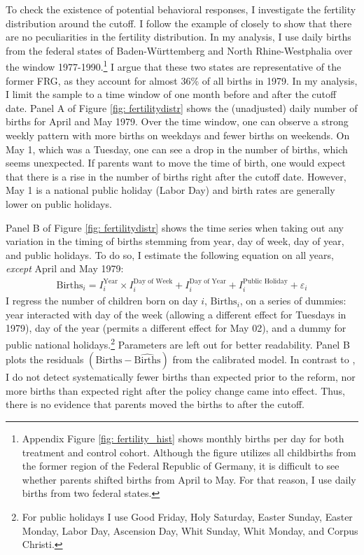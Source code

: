 \documentclass[11pt, a4paper, draft]{article} %
\begin{document}
To check the existence of potential behavioral responses, I investigate the fertility distribution around the cutoff. I follow the example of \cite{gans2009born} closely to show that there are no peculiarities in the fertility distribution. In my analysis, I use daily births from the federal states of Baden-Württemberg and North Rhine-Westphalia over the window 1977-1990.\footnote{Appendix Figure \ref{fig: fertility_hist} shows monthly births per day for both treatment and control cohort. Although the figure utilizes all childbirths from the former region of the Federal Republic of Germany, it is difficult to see whether parents shifted births from April to May. For that reason, I use daily births from two federal states.} I argue that these two states are representative of the former FRG, as they account for almost 36\% of all births in 1979. In my analysis, I limit the sample to a time window of one month before and after the cutoff date. Panel A of Figure \ref{fig: fertilitydistr} shows the (unadjusted) daily number of births for April and May 1979. Over the time window, one can observe a strong weekly pattern with more births on weekdays and fewer births on weekends. On May 1, which was a Tuesday, one can see a drop in the number of births, which seems unexpected. If parents want to move the time of birth, one would expect that there is a rise in the number of births right after the cutoff date. However, May 1 is a national public holiday (Labor Day) and birth rates are generally lower on public holidays.

Panel B of Figure \ref{fig: fertilitydistr} shows the time series when taking out any variation in the timing of births stemming from year, day of week, day of year, and public holidays. To do so, I estimate the following equation on all years, \emph{except} April and May 1979:
\begin{align}
\text{Births}_i = I^{\text{Year}}_i\times I^{\text{Day of Week}}_i + I^{\text{Day of Year}}_i + I^{\text{Public Holiday}}_i + \varepsilon_i \label{eq: validity_fig}
\end{align}
I regress the number of children born on day $i$, $\text{Births}_i$, on a series of dummies: year interacted with day of the week (allowing a different effect for Tuesdays in 1979), day of the year (permits a different effect for May 02), and a dummy for public national holidays.\footnote{For public holidays I use Good Friday, Holy Saturday, Easter Sunday, Easter Monday, Labor Day, Ascension Day, Whit Sunday, Whit Monday, and Corpus Christi.} Parameters are left out for better readability. Panel B plots the residuals $(\text{Births}-\widehat{\text{Births}})$ from the calibrated model. In contrast to \cite{gans2009born}, I do not detect systematically fewer births than expected prior to the reform, nor more births than expected right after the policy change came into effect. Thus, there is no evidence that parents moved the births to after the cutoff. 
\end{document}

